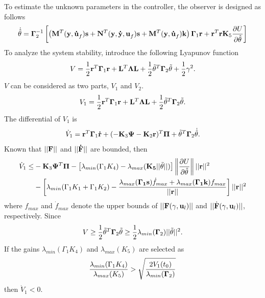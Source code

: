\documentclass[12pt,a4paper]{article}
\begin{document}
\indent To estimate the unknown parameters in the controller, the observer is designed as follows
\begin{equation}
\dot{\hat \theta}={\bf\Gamma}^{-1}_2
\left[
\left(
{\bf M}^T({\bf y,\dot u}_f){\bf s}+{\bf N}^T({\bf y,\dot y,u}_f){\bf s}+{\bf M}^T({\bf y,\dot u}_f){\bf k}
\right)
{\bf \Gamma}_1{\bf r}+{\bf r}^T{\bf r K}_5\frac{\partial U}{\partial \hat \theta}
\right]
\end{equation}
To analyze the system stability, introduce the following Lyapunov function
\begin{equation}
V=\frac{1}{2}{\bf r}^T{\bf\Gamma}_1{\bf r}+{\bf L}^T{\bf \Lambda L}
+\frac{1}{2}{\tilde\theta}^T{\bf\Gamma}_2{\tilde \theta}+\frac{1}{2}\gamma^2.
\end{equation}
$V$ can be considered as two parts, $V_1$ and $V_2$.
\begin{equation}
V_1=\frac{1}{2}{\bf r}^T{\bf\Gamma}_1{\bf r}+{\bf L}^T{\bf \Lambda L}
+\frac{1}{2}{\tilde\theta}^T{\bf\Gamma}_2{\tilde \theta}.
\end{equation}
The differential of $V_1$ is 
\begin{equation}
\dot V_1={\bf r}^T{\bf\Gamma}_1{\bf \dot r}+(-{\bf K}_3{\bf \Psi}-{\bf K}_2{\bf r})^T{\bf\Pi}+{\tilde\theta}^T{\bf\Gamma}_2{\dot{\hat \theta}}.
\end{equation}
Known that $||\bf F||$ and $||\bf \dot F||$ are bounded, then 
\begin{equation}
\begin{aligned}
\dot V_1\le
&-{\bf K}_3{\bf\Psi}^T{\bf \Pi}
-\left[\lambda_{min}({\Gamma_1 K_4})-\lambda_{max}({\bf K_5}||\tilde\theta||)\right]
\left\|\frac{\partial U}{\partial \hat\theta}\right\|||{\bf r}||^2 \\
&-\left[\lambda_{min}({\Gamma_1 K_1+\Gamma_1 K_2})
-\frac{\lambda_{max}({\bf \Gamma_1 s})\dot f_{max}+\lambda_{max}({\bf \Gamma_1 k})f_{max}}{||{\bf r}||}\right]
||{\bf r}||^2
\end{aligned}
\end{equation}
where $f_{max}$ and $\dot f_{max}$ denote the upper bounds of $||{\bf F}(\gamma,{\bf u}_l)||$ and $||\dot {\bf F}(\gamma,{\bf u}_l)||$, respectively. Since
\begin{equation}
V\ge\frac{1}{2}{\tilde\theta}^T{\bf\Gamma}_2{\tilde \theta}
\ge\frac{1}{2}\lambda_{min}({\bf \Gamma}_2)||\tilde \theta||^2.
\end{equation}
If the gains $\lambda_{min}({\Gamma_1 K_4})$ and $\lambda_{max}({K_5})$ are selected as
\begin{equation}
\frac{\lambda_{min}({\Gamma_1 K_4})}{\lambda_{max}({K_5})}
>\sqrt{\frac{2V_1(t_0)}{\lambda_{min}({\bf \Gamma}_2)}}
\end{equation}
then $\dot V_1<0$.
\end{document}
